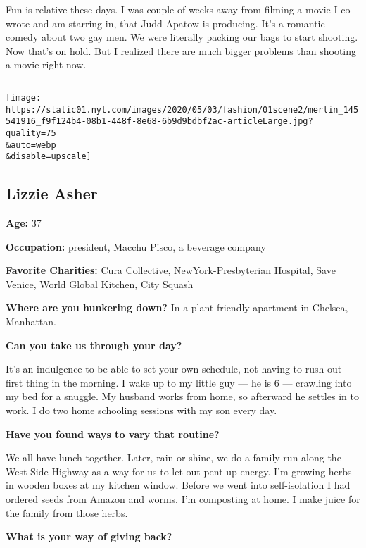 Fun is relative these days. I was couple of weeks away from filming a
movie I co-wrote and am starring in, that Judd Apatow is producing. It's
a romantic comedy about two gay men. We were literally packing our bags
to start shooting. Now that's on hold. But I realized there are much
bigger problems than shooting a movie right now.

\begin{center}\rule{0.5\linewidth}{\linethickness}\end{center}

\texttt{[image: https://static01.nyt.com/images/2020/05/03/fashion/01scene2/merlin\_145541916\_f9f124b4-08b1-448f-8e68-6b9d9bdbf2ac-articleLarge.jpg?quality=75\\\&auto=webp\\\&disable=upscale]}

\hypertarget{lizzie-asher}{%
\subsection{Lizzie Asher}\label{lizzie-asher}}

\textbf{Age:} 37

\textbf{Occupation:} president, Macchu Pisco, a beverage company

\textbf{Favorite Charities:} \href{https://www.curacollective.org/}{Cura
Collective}, NewYork-Presbyterian Hospital,
\href{https://www.savevenice.org}{Save Venice},
\href{https://wck.org/}{World Global Kitchen},
\href{http://citysquash.org/}{City Squash}

\textbf{Where are you hunkering down?} In a plant-friendly apartment in
Chelsea, Manhattan.

\textbf{Can you take us through your day?}

It's an indulgence to be able to set your own schedule, not having to
rush out first thing in the morning. I wake up to my little guy --- he
is 6 --- crawling into my bed for a snuggle. My husband works from home,
so afterward he settles in to work. I do two home schooling sessions
with my son every day.

\textbf{Have you found ways to vary that routine?}

We all have lunch together. Later, rain or shine, we do a family run
along the West Side Highway as a way for us to let out pent-up energy.
I'm growing herbs in wooden boxes at my kitchen window. Before we went
into self-isolation I had ordered seeds from Amazon and worms. I'm
composting at home. I make juice for the family from those herbs.

\textbf{What is your way of giving back?}

